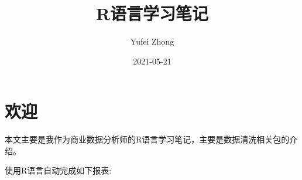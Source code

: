 \documentclass[
]{book}
\title{R语言学习笔记}
\author{Yufei Zhong}
\date{2021-05-21}
\begin{document}
\maketitle

{
\setcounter{tocdepth}{1}
\tableofcontents
}
\hypertarget{welcome}{%
\chapter*{欢迎}\label{welcome}}

本文主要是我作为商业数据分析师的R语言学习笔记，主要是数据清洗相关包的介绍。

使用R语言自动完成如下报表:

\providecommand{\docline}[3]{\noalign{\global\setlength{\arrayrulewidth}{#1}}\arrayrulecolor[HTML]{#2}\cline{#3}}

\setlength{\tabcolsep}{2pt}

\renewcommand*{\arraystretch}{1.5}
\end{document}

